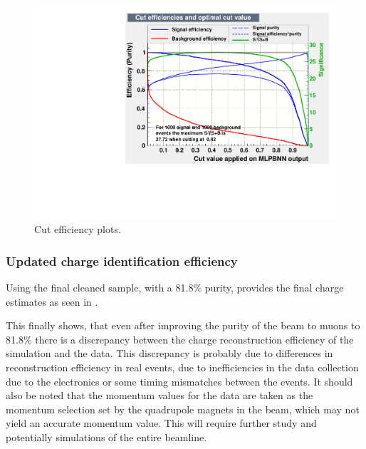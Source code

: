 \begin{figure}[h!]
\centering

\includegraphics[width=\textwidth]{figures/TMVA/Cuts.pdf}
\caption{Cut efficiency plots.}
\label{fig:TMVAcuts}
\end{figure}




\clearpage
\subsubsection{Updated charge identification efficiency}

Using the final cleaned sample, with a 81.8\% purity, provides the final charge estimates as seen in .

This finally shows, that even after improving the purity of the beam to muons to 81.8\% there is a discrepancy between the charge reconstruction efficiency of the simulation and the data. This discrepancy is probably due to differences in reconstruction efficiency in real events, due to inefficiencies in the data collection due to the electronics or some timing mismatches between the events. It should also be noted that the momentum values for the data are taken as the momentum selection set by the quadrupole magnets in the beam, which may not yield an accurate momentum value. This will require further study and potentially simulations of the entire beamline.

